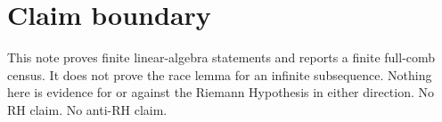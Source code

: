 \documentclass[11pt]{article}
\theoremstyle{remark}
\begin{document}
\section*{Claim boundary}

This note proves finite linear-algebra statements and reports a
finite full-comb census.  It does not prove the race lemma for an
infinite subsequence.  Nothing here is evidence for or against the
Riemann Hypothesis in either direction.  No RH claim.  No anti-RH
claim.
\end{document}
